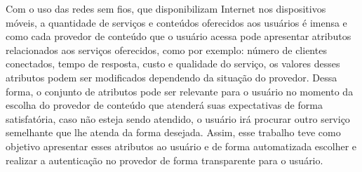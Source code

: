 \begin{resumo}
Com o uso das redes sem fios, que disponibilizam Internet nos dispositivos móveis, a quantidade de serviços e conteúdos oferecidos aos usuários é imensa e como cada provedor de conteúdo que o usuário acessa pode apresentar atributos relacionados aos serviços oferecidos, como por exemplo: número de clientes conectados, tempo de resposta, custo e qualidade do serviço, os valores desses atributos podem ser modificados dependendo da situação do provedor. Dessa forma, o conjunto de atributos pode ser relevante para o usuário no momento da escolha do provedor de conteúdo que atenderá suas expectativas de forma satisfatória, caso não esteja sendo atendido, o usuário irá procurar outro serviço semelhante que lhe atenda da forma desejada. Assim, esse trabalho teve como objetivo apresentar esses atributos ao usuário e de forma automatizada escolher e realizar a autenticação no provedor de forma transparente para o usuário.
\end{resumo}	
